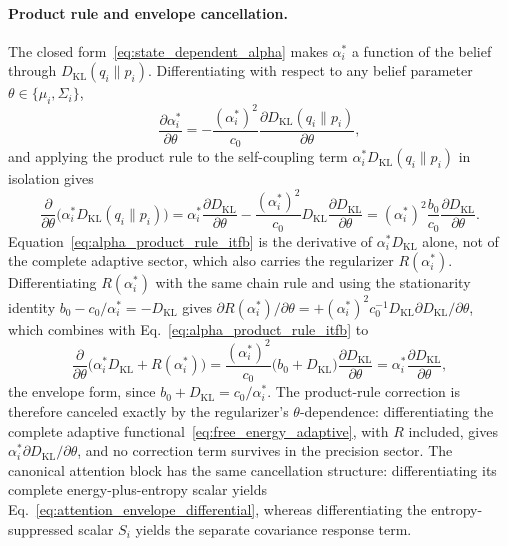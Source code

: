 \paragraph{Product rule and envelope cancellation.}
The closed form~\eqref{eq:state_dependent_alpha} makes $\alpha_i^*$ a function of the belief through $D_{\mathrm{KL}}(q_i \| p_i)$. Differentiating with respect to any belief parameter $\theta \in \{\mu_i, \Sigma_i\}$,
\begin{equation}
\frac{\partial \alpha_i^*}{\partial \theta} = -\frac{(\alpha_i^*)^2}{c_0} \frac{\partial D_{\mathrm{KL}}(q_i \| p_i)}{\partial \theta},
\label{eq:alpha_chain_rule_itfb}
\end{equation}
and applying the product rule to the self-coupling term $\alpha_i^* D_{\mathrm{KL}}(q_i \| p_i)$ in isolation gives
\begin{equation}
\frac{\partial}{\partial \theta}\bigl(\alpha_i^* D_{\mathrm{KL}}(q_i \| p_i)\bigr) = \alpha_i^* \frac{\partial D_{\mathrm{KL}}}{\partial \theta} - \frac{(\alpha_i^*)^2}{c_0} D_{\mathrm{KL}} \frac{\partial D_{\mathrm{KL}}}{\partial \theta} = (\alpha_i^*)^2 \frac{b_0}{c_0} \frac{\partial D_{\mathrm{KL}}}{\partial \theta}.
\label{eq:alpha_product_rule_itfb}
\end{equation}
Equation~\eqref{eq:alpha_product_rule_itfb} is the derivative of $\alpha_i^* D_{\mathrm{KL}}$ alone, not of the complete adaptive sector, which also carries the regularizer $R(\alpha_i^*)$. Differentiating $R(\alpha_i^*)$ with the same chain rule and using the stationarity identity $b_0 - c_0/\alpha_i^* = -D_{\mathrm{KL}}$ gives $\partial R(\alpha_i^*)/\partial\theta = +(\alpha_i^*)^2 c_0^{-1} D_{\mathrm{KL}}  \partial D_{\mathrm{KL}}/\partial\theta$, which combines with Eq.~\eqref{eq:alpha_product_rule_itfb} to
\begin{equation}
\frac{\partial}{\partial\theta}\bigl(\alpha_i^* D_{\mathrm{KL}} + R(\alpha_i^*)\bigr) = \frac{(\alpha_i^*)^2}{c_0}\bigl(b_0 + D_{\mathrm{KL}}\bigr)\frac{\partial D_{\mathrm{KL}}}{\partial\theta} = \alpha_i^*\frac{\partial D_{\mathrm{KL}}}{\partial\theta},
\label{eq:alpha_envelope_cancel_itfb}
\end{equation}
the envelope form, since $b_0 + D_{\mathrm{KL}} = c_0/\alpha_i^*$. The product-rule correction is therefore canceled exactly by the regularizer's $\theta$-dependence: differentiating the complete adaptive functional~\eqref{eq:free_energy_adaptive}, with $R$ included, gives $\alpha_i^* \partial D_{\mathrm{KL}}/\partial\theta$, and no correction term survives in the precision sector. The canonical attention block has the same cancellation structure: differentiating its complete energy-plus-entropy scalar yields Eq.~\eqref{eq:attention_envelope_differential}, whereas differentiating the entropy-suppressed scalar $S_i$ yields the separate covariance response term.

